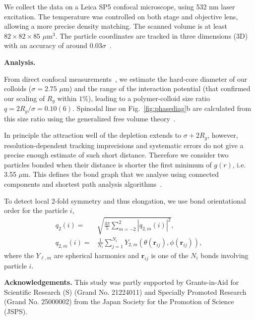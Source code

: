 \documentclass[preprint,footinbib,amsmath,amssymb]{revtex4}
\begin{document}
We collect the data on a Leica SP5 confocal microscope, using 532 nm laser excitation. The temperature was controlled on both stage and objective lens, allowing a more precise density matching. The scanned volume is at least $82 \times 82 \times 85$ $\mu$m$^3$. The particle coordinates are tracked in three dimensions (3D) with an accuracy of around $0.03\sigma$~\cite{LeocmachColloids}.

\vspace{0.5cm}
\noindent
{\bf Analysis.}

From direct confocal measurements~\cite{Royall2007, Poon2012}, we estimate the hard-core diameter of our colloids ($\sigma=2.75$ $\mu$m) and the range of the interaction potential (that confirmed our scaling of $R_g$ within $1\%$), leading to a polymer-colloid size ratio $q = 2R_g/\sigma = 0.10(6)$. Spinodal line on Fig.~\ref{fig:phasediag}b are calculated from this size ratio using the generalized free volume theory~\cite{Fleer2008}.

In principle the attraction well of the depletion extends to $\sigma+2R_g$, however, resolution-dependent tracking imprecisions and systematic errors do not give a precise enough estimate of such short distance. Therefore we consider two particles bonded when their distance is shorter the first minimum of $g(r)$, i.e. 3.55 $\mu$m. This defines the bond graph that we analyse using connected components and shortest path analysis algorithms~\cite{Hagberg2008}.


To detect local 2-fold symmetry and thus elongation, we use \citet{steinhardt1983boo} bond orientational order for the particle $i$,
\begin{align}
	q_2(i) =& \sqrt{\frac{4\pi}{5} \sum_{m=-2}^{2} |q_{2,m}(i)|^2 }, \label{eq:ql}\\
	q_{2,m}(i) =& \frac{1}{N_i}\sum_{j=1}^{N_i} Y_{2,m}(\theta(\mathbf{r}_{ij}),\phi(\mathbf{r}_{ij})),
	\label{eq:qlm}
\end{align}
where the $Y_{\ell, m}$ are spherical harmonics and $\mathbf{r}_{ij}$ is one of the $N_i$ bonds involving particle $i$.




\vspace{1cm}
\noindent
{\bf Acknowledgements.} This study was partly supported by Grants-in-Aid for Scientific Research (S) (Grand No. 21224011) and Specially Promoted Research (Grand No. 25000002) from 
the Japan Society for the Promotion of Science (JSPS). 
\end{document}
